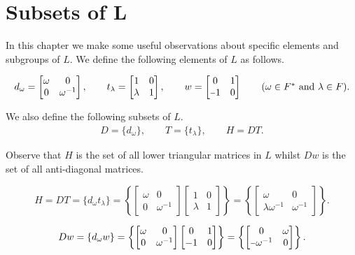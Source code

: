 \documentclass[a4paper , 11pt]{book}
\newcommand{\minus}{\scalebox{0.75}[1.0]{$-$}}
\theoremstyle{definition}
\theoremstyle{remark}
\begin{document}
\section[Subsets of $L$]{Subsets of $\pmb{L}$}

In this chapter we make some useful observations about specific elements and subgroups of $L$. We define the following elements of $L$ as follows.

\begin{align*} d_\omega = \begin{bmatrix} \omega & 0 \\ 0 & \omega^{-1} \end{bmatrix}, \qquad t_\lambda = \begin{bmatrix} 1 & 0 \\ \lambda & 1 \end{bmatrix}, \qquad w = \begin{bmatrix} 0 & 1 \\ \minus 1 & 0 \end{bmatrix}  \tag{$\omega \in F^*$ and $\lambda \in F$}.
\end{align*}

We also define the following subsets of $L$.
\begin{align*} D= \{d_\omega\}, \qquad T= \{t_\lambda\}, \qquad H=DT.
\end{align*}

Observe that $H$ is the set of all lower triangular matrices in $L$ whilst $Dw$ is the set of all anti-diagonal matrices.

\begin{equation} \label{Hlowertri} H = DT =  \{d_\omega t_\lambda\} = \left\{ \begin{bmatrix} \omega & 0 \\ 0 & \omega^{-1} \end{bmatrix} \begin{bmatrix} 1 & 0 \\ \lambda & 1 \end{bmatrix} \right\} = \left\{ \begin{bmatrix} \omega & 0 \\ \lambda \omega^{-1} & \omega^{-1} \end{bmatrix}  \right\}. \end{equation}

\begin{equation} \label{antidiag} Dw = \{ d_\omega w \} =  \left\{  \begin{bmatrix} \omega & 0 \\ 0 & \omega^{-1} \end{bmatrix} \begin{bmatrix} 0 & 1 \\ -1 & 0 \end{bmatrix} \right\} = \left\{ \begin{bmatrix} 0 & \omega \\ \minus\omega^{-1} & 0 \end{bmatrix}  \right\}. \end{equation}
\end{document}
